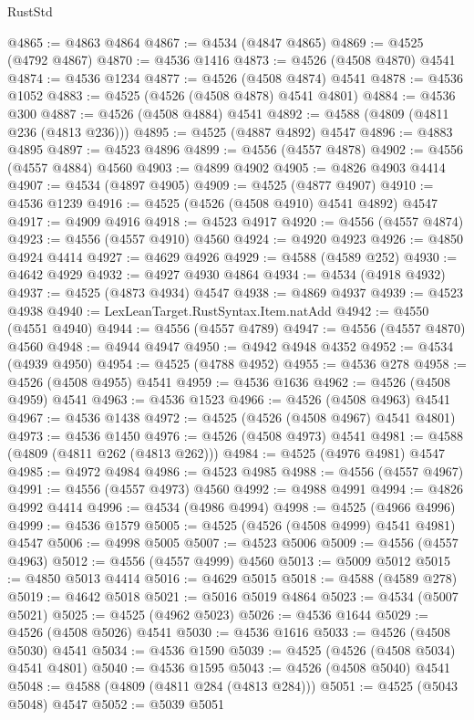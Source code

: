 \begin{lexlean}{RustStd}
\begin{coremodule}
@4865 := @4863 @4864
@4867 := @4534 (@4847 @4865)
@4869 := @4525 (@4792 @4867)
@4870 := @4536 @1416
@4873 := @4526 (@4508 @4870) @4541
@4874 := @4536 @1234
@4877 := @4526 (@4508 @4874) @4541
@4878 := @4536 @1052
@4883 := @4525 (@4526 (@4508 @4878) @4541 @4801)
@4884 := @4536 @300
@4887 := @4526 (@4508 @4884) @4541
@4892 := @4588 (@4809 (@4811 @236 (@4813 @236)))
@4895 := @4525 (@4887 @4892) @4547
@4896 := @4883 @4895
@4897 := @4523 @4896
@4899 := @4556 (@4557 @4878)
@4902 := @4556 (@4557 @4884) @4560
@4903 := @4899 @4902
@4905 := @4826 @4903 @4414
@4907 := @4534 (@4897 @4905)
@4909 := @4525 (@4877 @4907)
@4910 := @4536 @1239
@4916 := @4525 (@4526 (@4508 @4910) @4541 @4892) @4547
@4917 := @4909 @4916
@4918 := @4523 @4917
@4920 := @4556 (@4557 @4874)
@4923 := @4556 (@4557 @4910) @4560
@4924 := @4920 @4923
@4926 := @4850 @4924 @4414
@4927 := @4629 @4926
@4929 := @4588 (@4589 @252)
@4930 := @4642 @4929
@4932 := @4927 @4930 @4864
@4934 := @4534 (@4918 @4932)
@4937 := @4525 (@4873 @4934) @4547
@4938 := @4869 @4937
@4939 := @4523 @4938
@4940 := LexLeanTarget.RustSyntax.Item.natAdd
@4942 := @4550 (@4551 @4940)
@4944 := @4556 (@4557 @4789)
@4947 := @4556 (@4557 @4870) @4560
@4948 := @4944 @4947
@4950 := @4942 @4948 @4352
@4952 := @4534 (@4939 @4950)
@4954 := @4525 (@4788 @4952)
@4955 := @4536 @278
@4958 := @4526 (@4508 @4955) @4541
@4959 := @4536 @1636
@4962 := @4526 (@4508 @4959) @4541
@4963 := @4536 @1523
@4966 := @4526 (@4508 @4963) @4541
@4967 := @4536 @1438
@4972 := @4525 (@4526 (@4508 @4967) @4541 @4801)
@4973 := @4536 @1450
@4976 := @4526 (@4508 @4973) @4541
@4981 := @4588 (@4809 (@4811 @262 (@4813 @262)))
@4984 := @4525 (@4976 @4981) @4547
@4985 := @4972 @4984
@4986 := @4523 @4985
@4988 := @4556 (@4557 @4967)
@4991 := @4556 (@4557 @4973) @4560
@4992 := @4988 @4991
@4994 := @4826 @4992 @4414
@4996 := @4534 (@4986 @4994)
@4998 := @4525 (@4966 @4996)
@4999 := @4536 @1579
@5005 := @4525 (@4526 (@4508 @4999) @4541 @4981) @4547
@5006 := @4998 @5005
@5007 := @4523 @5006
@5009 := @4556 (@4557 @4963)
@5012 := @4556 (@4557 @4999) @4560
@5013 := @5009 @5012
@5015 := @4850 @5013 @4414
@5016 := @4629 @5015
@5018 := @4588 (@4589 @278)
@5019 := @4642 @5018
@5021 := @5016 @5019 @4864
@5023 := @4534 (@5007 @5021)
@5025 := @4525 (@4962 @5023)
@5026 := @4536 @1644
@5029 := @4526 (@4508 @5026) @4541
@5030 := @4536 @1616
@5033 := @4526 (@4508 @5030) @4541
@5034 := @4536 @1590
@5039 := @4525 (@4526 (@4508 @5034) @4541 @4801)
@5040 := @4536 @1595
@5043 := @4526 (@4508 @5040) @4541
@5048 := @4588 (@4809 (@4811 @284 (@4813 @284)))
@5051 := @4525 (@5043 @5048) @4547
@5052 := @5039 @5051

\end{coremodule}
\end{lexlean}
